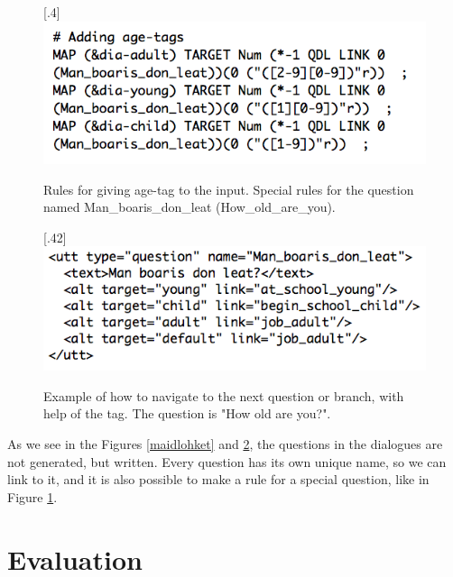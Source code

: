 \documentclass[11pt]{article}
\begin{document}
\begin{figure}[htbp]
\begin{center}
\scalebox{.4}[.4]{\includegraphics{presentation/img/picking_age2.png}}\\
\caption{Rules for giving age-tag to the input. Special rules for the question named Man\_boaris\_don\_leat (How\_old\_are\_you).}
\label{age}
\end{center}
\end{figure}


\begin{figure}[htbp]
\begin{center}
\scalebox{.42}[.42]{\includegraphics{presentation/img/Man_boarisEng.png}}\\
\caption{Example of how to navigate to the next question or branch, with help of the tag. The question is "How old are you?".}
\label{branch}
\end{center}
\end{figure}

As we see in the Figures \ref{maidlohket} and \ref{branch}, the questions in the dialogues are not generated, but written. Every question has its own unique name, so we can link to it, and it is also possible to make a rule for a special question, like in Figure \ref{age}.  



\section{Evaluation}
\end{document}
